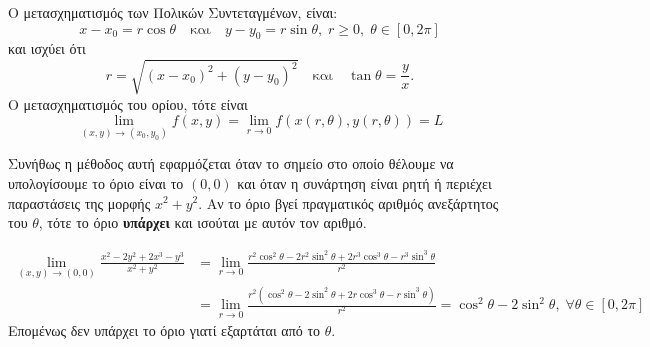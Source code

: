 \begin{rem}
\item {}
  \begin{myitemize}
    \item Ο μετασχηματισμός των Πολικών Συντεταγμένων, είναι:
      \[
        x - x_{0} = r \cos{\theta} \quad \text{και} \quad y - y_{0} = 
        r \sin{\theta}, \; r \geq 0, \; \theta \in [0, 2 \pi]
      \] 
      και ισχύει ότι 
      \[
        r = \sqrt{(x- x_{0})^{2}+(y- y_{0})^{2}} \quad \text{και} \quad \tan\theta = 
        \frac{y}{x}.
      \] 
      Ο μετασχηματισμός του ορίου, τότε είναι 
      \[
        \lim\limits_{(x,y)\to (x_{0}, y_{0})} f(x,y) = 
        \lim_{r \to 0} f(x(r, \theta ), y(r, \theta)) = L
      \] 

    \item Συνήθως η μέθοδος αυτή εφαρμόζεται όταν το σημείο στο οποίο θέλουμε να 
      υπολογίσουμε το όριο είναι το $ (0,0) $ και όταν η συνάρτηση είναι ρητή ή 
      περιέχει παραστάσεις της μορφής $ x^{2}+y^{2} $. Αν το όριο βγεί 
      πραγματικός αριθμός ανεξάρτητος του $\theta$, τότε το όριο \textbf{υπάρχει} και 
      ισούται με αυτόν τον αριθμό.
  \end{myitemize}
\end{rem}

\begin{example}
  \begin{align*} \lim\limits_{(x,y)\to (0, 0)} 
    \frac{x^{2}-2y^{2}+2x^{3}-y^{3}}{x^{2}+y^{2}} 
               &= \lim_{r \to 0} \frac{r^{2} \cos^{2}{\theta} - 2r^{2} \sin^{2}{\theta 
               +2r^{3} \cos^{3}{\theta - r^{3} \sin^{3}{\theta}}}}{r^{2}} \\ 
               &= \lim_{r \to 0} \frac{r^{2}(\cos^{2}{\theta} - 2 \sin^{2}{\theta} +2r 
               \cos^{3}{\theta} - r \sin^{3}{\theta})}{r^{2}} = 
               \cos^{2}{\theta} - 2 \sin^{2}{\theta}, \; \forall \theta \in [0, 2 \pi]
  \end{align*}
  Επομένως δεν υπάρχει το όριο γιατί εξαρτάται από το $\theta$.
\end{example}

